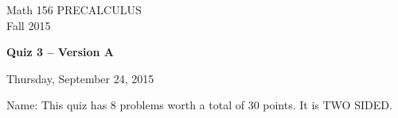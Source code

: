 \documentclass[11pt]{article}
\begin{document}
\begin{center}
\vspace{2in}

\huge{Math 156 PRECALCULUS \\
Fall 2015}

\vfill

\huge{\bf{Quiz 3 -- Version A}}\\

\vspace{0.5in}

\large{Thursday, September 24, 2015}\\

\vfill


{\huge{Name:{\underline{\hspace{2in}}}}}
\vfill
This quiz has 8 problems worth a total of 30 points. It is TWO SIDED. 
\vfill
\end{center}
\newpage
\restoregeometry
\end{document}
